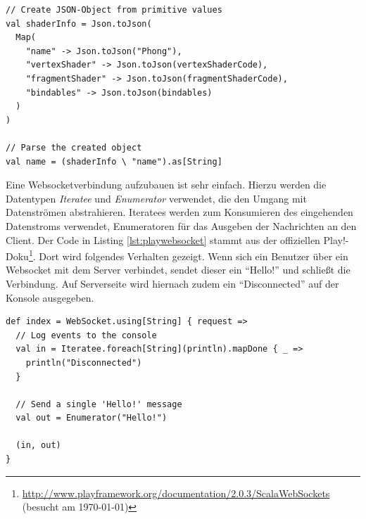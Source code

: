 \lstset{language=Scala}
\begin{lstlisting}[caption={Erstellen und parsen eines JSON-Objekts}, label={lst:playjson}]
// Create JSON-Object from primitive values
val shaderInfo = Json.toJson(
  Map(
    "name" -> Json.toJson("Phong"),
    "vertexShader" -> Json.toJson(vertexShaderCode),
    "fragmentShader" -> Json.toJson(fragmentShaderCode),
    "bindables" -> Json.toJson(bindables)
  )
)

// Parse the created object
val name = (shaderInfo \ "name").as[String]
\end{lstlisting}
Eine Websocketverbindung aufzubauen ist sehr einfach. Hierzu werden die Datentypen \textit{Iteratee} und \textit{Enumerator} verwendet, die den Umgang mit Datenströmen abstrahieren. Iteratees werden zum Konsumieren des eingehenden Datenstroms verwendet, Enumeratoren für das Ausgeben der Nachrichten an den Client. Der Code in Listing \ref{lst:playwebsocket} stammt aus der offiziellen Play!-Doku\footnote{\url{http://www.playframework.org/documentation/2.0.3/ScalaWebSockets} (besucht am \today)}. Dort wird folgendes Verhalten gezeigt. Wenn sich ein Benutzer über ein Websocket mit dem Server verbindet, sendet dieser ein "`Hello!"' und schließt die Verbindung. Auf Serverseite wird hiernach zudem ein "`Disconnected"' auf der Konsole ausgegeben.
\lstset{language=Scala}
\begin{lstlisting}[caption={Empfangen und Senden über ein WebSocket in Play!}, label={lst:playwebsocket}]
def index = WebSocket.using[String] { request => 
  // Log events to the console
  val in = Iteratee.foreach[String](println).mapDone { _ =>
    println("Disconnected")
  }
  
  // Send a single 'Hello!' message
  val out = Enumerator("Hello!")
  
  (in, out)
}
\end{lstlisting}

